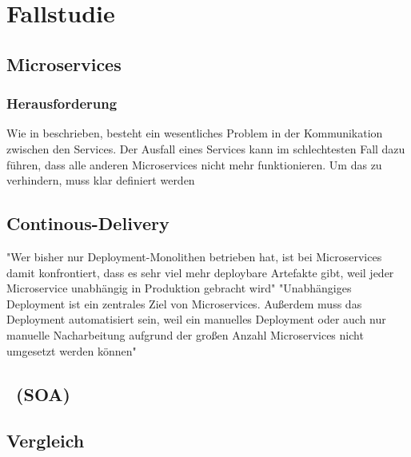 \chapter{Fallstudie}
\label{chap:fallstudie}

\section{Microservices}
\subsection{Herausforderung}
Wie in \cite[S. 25]{EWolff2016:Microservices} beschrieben, besteht ein wesentliches Problem in der Kommunikation zwischen den Services. Der Ausfall eines Services kann im schlechtesten Fall dazu führen, dass alle anderen Microservices nicht mehr funktionieren. Um das zu verhindern, muss klar definiert werden

\section{Continous-Delivery}
\label{sec:ContinousDelivery}
"Wer bisher nur Deployment-Monolithen betrieben hat, ist bei Microservices damit konfrontiert, dass es sehr viel mehr deploybare Artefakte gibt, weil jeder Microservice unabhängig in Produktion gebracht wird"\cite[S. 241]{EWolff2016:Microservices}
"Unabhängiges Deployment ist ein zentrales Ziel von Microservices. Außerdem muss das Deployment automatisiert sein, weil ein manuelles Deployment oder auch nur manuelle Nacharbeitung aufgrund der großen Anzahl Microservices nicht umgesetzt werden können"\cite[S. 256]{EWolff2016:Microservices}

\section{\SOA\ (SOA)}

\section{Vergleich}

